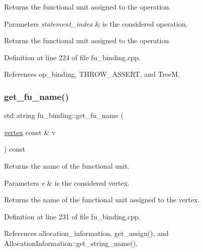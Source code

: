 Returns the functional unit assigned to the operation. 


\begin{DoxyParams}{Parameters}
{\em statement\+\_\+index} & is the considered operation. \\
\hline
\end{DoxyParams}
\begin{DoxyReturn}{Returns}
the functional unit assigned to the operation 
\end{DoxyReturn}


Definition at line 224 of file fu\+\_\+binding.\+cpp.



References op\+\_\+binding, T\+H\+R\+O\+W\+\_\+\+A\+S\+S\+E\+RT, and TreeM.

\mbox{\label{classfu__binding_a92729622430342e6827ecb5398a71379}} 
\subsubsection{\texorpdfstring{get\+\_\+fu\+\_\+name()}{get\_fu\_name()}}
{\footnotesize\ttfamily std\+::string fu\+\_\+binding\+::get\+\_\+fu\+\_\+name (\begin{DoxyParamCaption}\item[{\hyperlink{graph_8hpp_abefdcf0544e601805af44eca032cca14}{vertex} const \&}]{v }\end{DoxyParamCaption}) const}



Returns the name of the functional unit. 


\begin{DoxyParams}{Parameters}
{\em v} & is the considered vertex. \\
\hline
\end{DoxyParams}
\begin{DoxyReturn}{Returns}
the name of the functional unit assigned to the vertex. 
\end{DoxyReturn}


Definition at line 231 of file fu\+\_\+binding.\+cpp.



References allocation\+\_\+information, get\+\_\+assign(), and Allocation\+Information\+::get\+\_\+string\+\_\+name().



